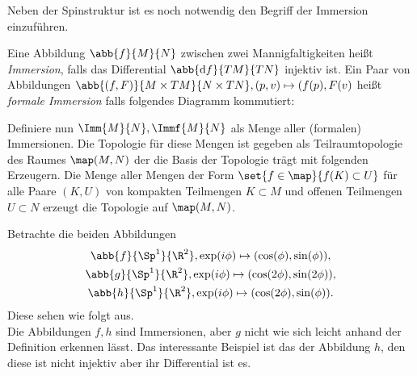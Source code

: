 
Neben der Spinstruktur ist es noch notwendig den Begriff der Immersion 
einzuführen.

\begin{Def}
	Eine Abbildung $\abb{f}{M}{N}$ zwischen zwei Mannigfaltigkeiten
	heißt \textit{Immersion}, falls das Differential $\abb{\mathrm{d} f}{TM}{TN}$ 
	injektiv ist.
	Ein Paar von Abbildungen $\abb{(f,F)}{M \times TM}{N \times TN} ,%
	(p,v) \mapsto (f(p),F(v)$ heißt \textit{formale Immersion} falls folgendes
	Diagramm kommutiert:
	\begin{center}
		
		
	\end{center}
	
	Definiere nun $\Imm{M}{N},\Immf{M}{N}$ als Menge aller (formalen) Immersionen. Die Topologie für diese Mengen ist gegeben als Teilraumtopologie des Raumes $\map(M,N)$ der die Basis der Topologie 
	trägt mit folgenden Erzeugern. Die Menge aller Mengen der Form $\set{f \in \map}{ f(K) \subset U}$
	für alle Paare $(K,U)$ von kompakten Teilmengen $K \subset M$ und
	offenen Teilmengen $U \subset N$ erzeugt die Topologie auf $\map(M,N)$.
\end{Def}


\begin{Bsp}
	Betrachte die beiden Abbildungen 
	\begin{gather*}
		\abb{f}{\Sp^1}{\R^2}, \exp(i\phi)%
		\mapsto (\cos(\phi),\sin(\phi)),\\
		\abb{g}{\Sp^1}{\R^2}, \exp(i\phi)%
		\mapsto (\cos(2\phi),\sin(2\phi)),\\
		\abb{h}{\Sp^1}{\R^2}, \exp(i\phi)%
		\mapsto (\cos(2\phi),\sin(\phi)).
	\end{gather*}
	Diese sehen wie folgt aus.\\
	
	Die Abbildungen $f,h$ sind Immersionen, aber $g$ nicht wie sich leicht
	anhand der Definition erkennen lässt. Das interessante Beispiel ist
	das der Abbildung $h$, den diese ist nicht injektiv aber ihr Differential
	ist es.
\end{Bsp}

